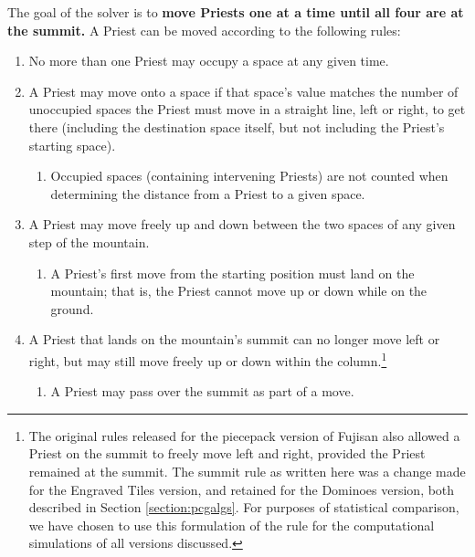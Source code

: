 \documentclass[10pt,journal,compsoc]{IEEEtran}
\begin{document}
The goal of the solver is to {\bf move Priests one at a time until all four are at the summit.} A Priest can be moved according to the following rules:  

\begin{enumerate}
\item No more than one Priest may occupy a space at any given time.

\item A Priest may move onto a space if that space's value matches the number of unoccupied spaces the Priest must move in a straight line, left or right, to get there (including the destination space itself, but not including the Priest's starting space). %
\begin{enumerate}
\item Occupied spaces (containing intervening Priests) are not counted when determining the distance from a Priest to a given space. %
\end{enumerate}
\item A Priest may move freely up and down between the two spaces of any given step of the mountain. %
\begin{enumerate}
\item A Priest's first move from the starting position must land on the mountain; that is, the Priest cannot move up or down while on the ground.
\end{enumerate}

\item A Priest that lands on the mountain's summit can no longer move left or right, but may still move freely up or down within the column.\footnote{The original rules released for the piecepack version of Fujisan also allowed a Priest on the summit to freely move left and right, provided the Priest remained at the summit. The summit rule as written here was a change made for the Engraved Tiles version, and retained for the Dominoes version, both described in Section \ref{section:pcgalgs}. For purposes of statistical comparison, we have chosen to use this formulation of the rule for the computational simulations of all versions discussed.}
\begin{enumerate}
\item A Priest may pass over the summit as part of a move.
\end{enumerate}


\end{enumerate}
\end{document}
